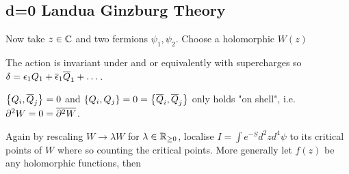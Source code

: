 \documentclass{article}
\begin{document}
\subsection{d=0 Landua Ginzburg Theory}
Now take $z\in\mbb{C}$ and two fermions $\psi_1,\psi_2$. Choose a holomorphic $W(z)$
\begin{prop}
The action is invariant under 
and 
or equivalently with supercharges
so $\delta= \eps_1 Q_1 + \bar{\eps}_1 \bar{Q}_1 + \dots$. 
\end{prop}
\begin{prop}
 $\acomm[Q_i]{\bar{Q}_j}=0$ and $\acomm[Q_i]{Q_j}=0=\acomm[\bar{Q}_i]{\bar{Q}_j}$ only holds "on shell", i.e. $\del^2 W = 0 = \bar{\del^2 W}$.
 \end{prop}
Again by rescaling $W \to \lambda W$ for $\lambda \in \mbb{R}_{\geq 0}$, localise $I = \int e^{-S} d^2z d^4\psi$ to its critical points of $W$ where 
so 
counting the critical points. More generally let $f(z)$ be any holomorphic functions, then 
\end{document}
